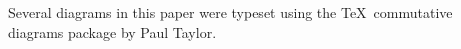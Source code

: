\documentclass[12pt]{article}
\theoremstyle{plain}
\theoremstyle{definition}
\theoremstyle{remark}
\newcommand{\bd}{\partial}
\begin{document}
\begin{comment}

Suppose V is a cycle transverse to N that bounds. Then there is a Z transverse to N that realizes it:

Choose Y so that \bd Y \sqcup  -V \in Q. Y may not be transverse.

Do a universal homotopy on Y \sqcup V so that Y becomes transverse and the trace of V is transverse. Let Y’ and V’ be the results and let W be the trace of the V homotopy. Let Z = Y’ \sqcup -W, which is transverse. Also \bd Y’ \sqcup -V’ is in Q.

Then \bd Z \sqcup -V is
                                                          (\bd Y’ \sqcup - V’ \sqcup V \sqcup -V)
Which is in Q.


\end{comment}


Several diagrams in this paper were typeset using the \TeX\, commutative
diagrams package by Paul Taylor.
\end{document}
